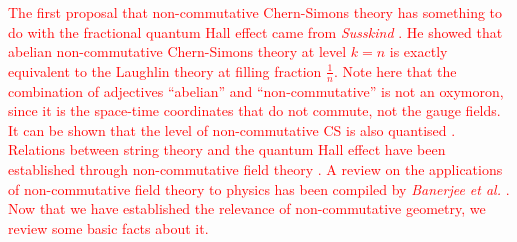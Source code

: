     \indent \textcolor{red}{The first proposal that non-commutative Chern-Simons theory has something to do with the fractional quantum Hall effect came from \textit{Susskind} \cite{Susskind:2001fb}. He showed that abelian non-commutative Chern-Simons theory at level $k=n$ is exactly equivalent to the Laughlin theory at filling fraction $\frac{1}{n}$. Note here that the combination of adjectives ``abelian'' and ``non-commutative'' is not an oxymoron, since it is the space-time coordinates that do not commute, not the gauge fields. It can be shown that the level of non-commutative CS is also quantised \cite{Nair:2001rt, Bak:2001ze}. Relations between string theory and the quantum Hall effect have been established through non-commutative field theory \cite{Brodie:2000yz, Bena:2000cs, Gubser:2000dz}.  A review on the applications of non-commutative field theory to physics has been compiled by \textit{Banerjee et al.} \cite{Banerjee:2009gr}. 
    Now that we have established the relevance of non-commutative geometry, we review some basic facts about it.}
